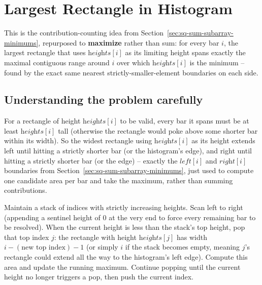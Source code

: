 \section{Largest Rectangle in Histogram}
\label{sec:sq-largest-rectangle-histogram}


\begin{patternbox}
This is the contribution-counting idea from
Section~\ref{sec:sq-sum-subarray-minimums}, repurposed to
\textbf{maximize} rather than sum: for every bar $i$, the largest
rectangle that uses $\textit{heights}[i]$ as its limiting height spans
exactly the maximal contiguous range around $i$ over which
$\textit{heights}[i]$ is the minimum -- found by the exact same nearest
strictly-smaller-element boundaries on each side.
\end{patternbox}

\subsection*{Understanding the problem carefully}

For a rectangle of height $\textit{heights}[i]$ to be valid, every bar it
spans must be at least $\textit{heights}[i]$ tall (otherwise the
rectangle would poke above some shorter bar within its width). So the
widest rectangle using $\textit{heights}[i]$ as its height extends left
until hitting a strictly shorter bar (or the histogram's edge), and right
until hitting a strictly shorter bar (or the edge) -- exactly the
$\textit{left}[i]$ and $\textit{right}[i]$ boundaries from
Section~\ref{sec:sq-sum-subarray-minimums}, just used to compute one
candidate area per bar and take the maximum, rather than summing
contributions.

\begin{ideabox}
Maintain a stack of indices with strictly increasing heights. Scan left
to right (appending a sentinel height of $0$ at the very end to force
every remaining bar to be resolved). When the current height is less than
the stack's top height, pop that top index $j$: the rectangle with height
$\textit{heights}[j]$ has width $i - (\text{new top index}) - 1$ (or
simply $i$ if the stack becomes empty, meaning $j$'s rectangle could
extend all the way to the histogram's left edge). Compute this area and
update the running maximum. Continue popping until the current height no
longer triggers a pop, then push the current index.
\end{ideabox}

